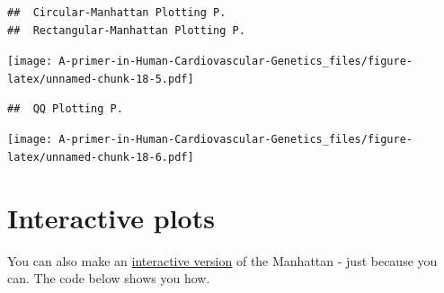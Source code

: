 \documentclass[
]{book}
\begin{document}
\begin{verbatim}
##  Circular-Manhattan Plotting P.
##  Rectangular-Manhattan Plotting P.
\end{verbatim}

\texttt{[image: A-primer-in-Human-Cardiovascular-Genetics\_files/figure-latex/unnamed-chunk-18-5.pdf]}

\begin{verbatim}
##  QQ Plotting P.
\end{verbatim}

\texttt{[image: A-primer-in-Human-Cardiovascular-Genetics\_files/figure-latex/unnamed-chunk-18-6.pdf]}

\hypertarget{interactive-plots}{%
\section{Interactive plots}\label{interactive-plots}}

You can also make an \href{https://r-graph-gallery.com/101_Manhattan_plot.html}{interactive version} of the Manhattan - just because you can. The code below shows you how.
\end{document}
